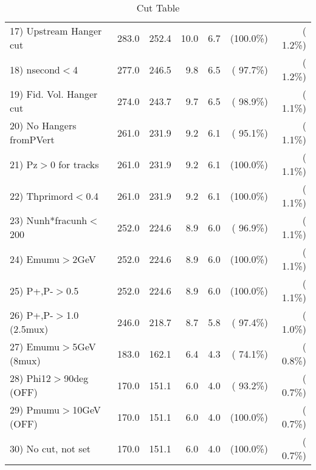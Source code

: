 \begin{table}[h!]
\begin{tabular}{||l||r|r|r|r|r|r||}
 17) Upstream Hanger cut  &        283.0 &        252.4 &         10.0 &          6.7 & (100.0\%) & (  1.2\%) \\
 18) nsecond$<$4          &        277.0 &        246.5 &          9.8 &          6.5 & ( 97.7\%) & (  1.2\%) \\
 19) Fid. Vol. Hanger cut &        274.0 &        243.7 &          9.7 &          6.5 & ( 98.9\%) & (  1.1\%) \\
 20) No Hangers fromPVert &        261.0 &        231.9 &          9.2 &          6.1 & ( 95.1\%) & (  1.1\%) \\
 21) Pz$>$0 for tracks    &        261.0 &        231.9 &          9.2 &          6.1 & (100.0\%) & (  1.1\%) \\
 22) Thprimord$<$0.4      &        261.0 &        231.9 &          9.2 &          6.1 & (100.0\%) & (  1.1\%) \\
 23) Nunh*fracunh$<$200   &        252.0 &        224.6 &          8.9 &          6.0 & ( 96.9\%) & (  1.1\%) \\
 24) Emumu$>$2GeV         &        252.0 &        224.6 &          8.9 &          6.0 & (100.0\%) & (  1.1\%) \\
 25) P+,P-$>$0.5          &        252.0 &        224.6 &          8.9 &          6.0 & (100.0\%) & (  1.1\%) \\
 26) P+,P-$>$1.0 (2.5mux) &        246.0 &        218.7 &          8.7 &          5.8 & ( 97.4\%) & (  1.0\%) \\
 27) Emumu$>$5GeV  (8mux) &        183.0 &        162.1 &          6.4 &          4.3 & ( 74.1\%) & (  0.8\%) \\
 28) Phi12$>$90deg  (OFF) &        170.0 &        151.1 &          6.0 &          4.0 & ( 93.2\%) & (  0.7\%) \\
 29) Pmumu$>$10GeV  (OFF) &        170.0 &        151.1 &          6.0 &          4.0 & (100.0\%) & (  0.7\%) \\
 30) No cut, not set      &        170.0 &        151.1 &          6.0 &          4.0 & (100.0\%) & (  0.7\%) \\
 \hline
 \hline
 \end{tabular}
 \caption{Cut Table           }
 \label{tab-cutcohjpsi-mumu_cohrho0}
 \end{table}

